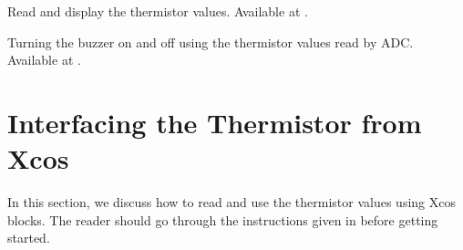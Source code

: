 \begin{scicode}
   {Read and display
    the thermistor values.  Available at
    .}
  \label{sci:therm-read}
  
\end{scicode}

\begin{scicode}
  {Turning the buzzer on and off using the thermistor values read by
    ADC.  Available at .}
  \label{sci:therm-buzzer}
  
\end{scicode}

\section{Interfacing the Thermistor from Xcos}
In this section, we discuss how to read and use the thermistor values using
Xcos blocks. The reader should go
through the instructions given in  before
getting started.

